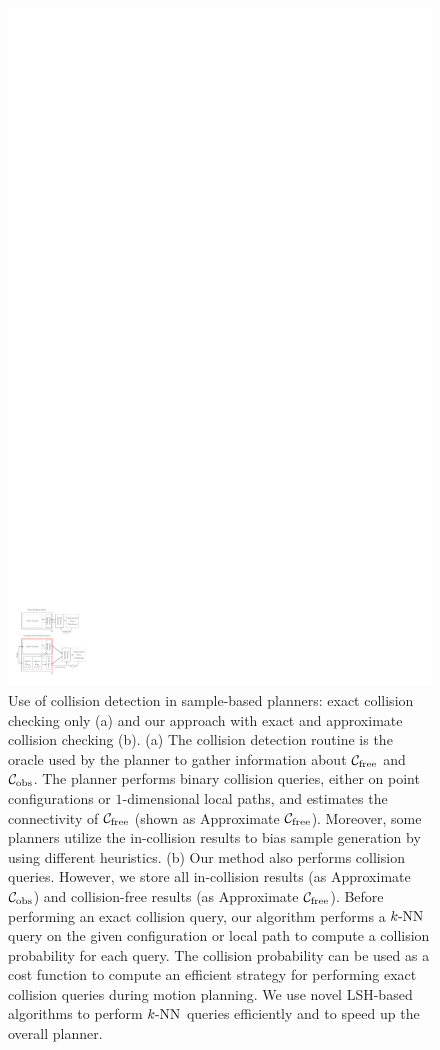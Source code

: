 \begin{figure}[htb]
  \centering
  \includegraphics[width=\linewidth]{figs/3/oracle.pdf}
  \caption[Comparison between prior sample-based planners and planners enhanced by instance-based learning]{Use of collision detection in sample-based planners: exact collision checking only (a) and our approach with exact and approximate collision checking (b). (a) The collision detection routine is the oracle used by the planner to gather information about $\mathcal C_{\text{free}}$ and $\mathcal C_{\text{obs}}$. The planner performs binary collision queries, either on point configurations or $1$-dimensional local paths, and estimates the connectivity of $\mathcal C_{\text{free}}$ (shown as Approximate $\mathcal C_{\text{free}}$). Moreover, some planners utilize the in-collision results to bias sample generation by using different heuristics. (b) Our method also performs collision queries. However, we store all in-collision results (as Approximate $\mathcal C_{\text{obs}}$) and collision-free results (as Approximate $\mathcal C_{\text{free}}$). Before performing an exact collision query, our algorithm performs a $k\text{-NN}$ query on the given configuration or local path to compute a collision probability for each query. The collision probability can be used as a cost function to compute an efficient strategy for performing exact collision queries during motion planning. We use novel LSH-based algorithms to perform $k\text{-NN}$ queries efficiently and to speed up the overall planner.}

\end{figure}
